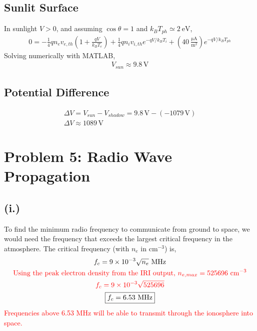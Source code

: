 \documentclass[11pt]{article}
\begin{document}
\subsection*{Sunlit Surface}
\hspace*{2em}In sunlight $V > 0$, and assuming $\cos\theta = 1$ and $k_B T_{ph} \simeq 2~\mathrm{eV}$,
\begin{gather*}
0 = -\frac{1}{4} q n_e v_{e,th}\left(1 + \frac{qV}{k_B T_e}\right) + \frac{1}{4} q n_i v_{i,th} e^{-qV/k_B T_i} + \left(40~\mathrm{\frac{\mu A}{m^2}}\right) e^{-qV/k_B T_{ph}}
\end{gather*}
\hspace*{2em}Solving numerically with MATLAB,
\begin{gather*}
\boxed{V_{sun} \approx 9.8\,\mathrm{V}}
\end{gather*}

\subsection*{Potential Difference}
\begin{gather*}
\Delta V = V_{sun} - V_{shadow} = 9.8\,\mathrm{V} - (-1079\,\mathrm{V}) \\
\boxed{\Delta V \approx 1089\,\mathrm{V}}
\end{gather*}

\newpage
\section*{Problem 5: Radio Wave Propagation}
\subsection*{(i.)}
\hspace*{2em}To find the minimum radio frequency to communicate from ground
to space, we would need the frequency that exceeds the largest critical frequency in 
the atmosphere. The critical frequency (with $n_e$ in cm$^{-3}$) is,
\begin{gather*}
f_c = 9\times10^{-3}\sqrt{n_e}~\mathrm{MHz} \\
\textcolor{red}{\text{Using the peak electron density from the IRI output, } n_{e,max} = 525696~\mathrm{cm^{-3}}} \\
\textcolor{red}{f_c = 9\times10^{-3}\sqrt{525696}} \\
\boxed{f_c = 6.53~\mathrm{MHz}}
\end{gather*}
\hspace*{2em}\textcolor{red}{Frequencies above 6.53 MHz will be able to transmit through the ionosphere into space.}
\end{document}
